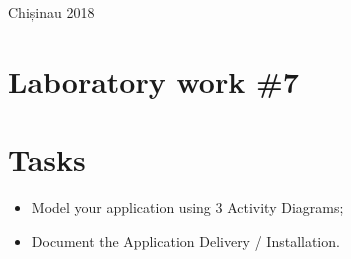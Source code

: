 \documentclass[12pt,a4paper,titlepage]{article}
\begin{document}
\begin{titlepage}
\begin{center}
      \vspace{5 mm}


      {\large Chișinau 2018}\\[3cm] %




      \vfill %
      \end{center}
      
\end{titlepage}

\cleardoublepage

\newpage

\setcounter{page}{1}
\setcounter{secnumdepth}{4}

\cleardoublepage


{}
\section*{Laboratory work \#7}

\section{Tasks}
\begin{itemize}
	\item
	Model your application using 3 Activity Diagrams;
	\item 
	Document the Application Delivery / Installation.
\end{itemize}
\end{document}
